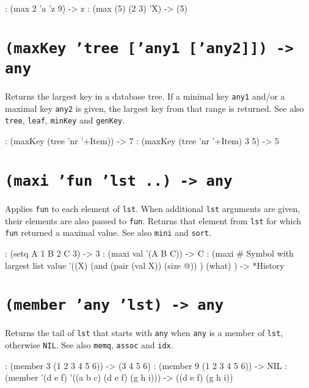 \begin{wideverbatim}
: (max 2 'a 'z 9)
-> z
: (max (5) (2 3) 'X)
-> (5)
\end{wideverbatim}

 
\section*{\texttt{(maxKey 'tree ['any1 ['any2]]) -> any}}
\label{sec:func-ref-M-(maxKey 'tree ['any1 ['any2]]) -> any}


Returns the largest key in a database tree. If a minimal key \texttt{any1}
and/or a maximal key \texttt{any2} is given, the largest key from that range is
returned. See also \texttt{tree}, \texttt{leaf}, \texttt{minKey} and \texttt{genKey}.


\begin{wideverbatim}
: (maxKey (tree 'nr '+Item))
-> 7
: (maxKey (tree 'nr '+Item) 3 5)
-> 5
\end{wideverbatim}

 
\section*{\texttt{(maxi 'fun 'lst ..) -> any}}
\label{sec:func-ref-M-(maxi 'fun 'lst ..) -> any}


Applies \texttt{fun} to each element of \texttt{lst}. When additional \texttt{lst} arguments
are given, their elements are also passed to \texttt{fun}. Returns that element
from \texttt{lst} for which \texttt{fun} returned a maximal value. See also \texttt{mini} and
\texttt{sort}.


\begin{wideverbatim}
: (setq A 1  B 2  C 3)
-> 3
: (maxi val '(A B C))
-> C
: (maxi                          # Symbol with largest list value
   '((X)
      (and (pair (val X)) (size @)) )
   (what) )
-> *History
\end{wideverbatim}

 
\section*{\texttt{(member 'any 'lst) -> any}}
\label{sec:func-ref-M-(member 'any 'lst) -> any}


Returns the tail of \texttt{lst} that starts with \texttt{any} when \texttt{any} is a member
of \texttt{lst}, otherwise \texttt{NIL}. See also \texttt{memq}, \texttt{assoc} and \texttt{idx}.


\begin{wideverbatim}
: (member 3 (1 2 3 4 5 6))
-> (3 4 5 6)
: (member 9 (1 2 3 4 5 6))
-> NIL
: (member '(d e f) '((a b c) (d e f) (g h i)))
-> ((d e f) (g h i))
\end{wideverbatim}

